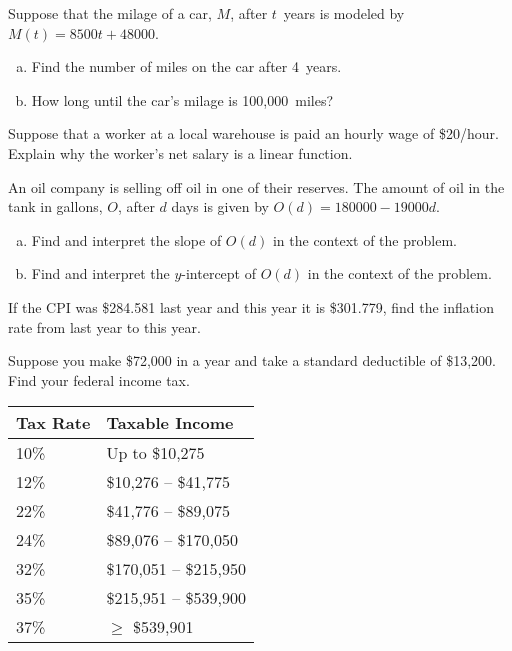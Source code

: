 \documentclass[12pt,letterpaper]{exam}
\begin{document}
\examtitle
{} 
\scores
\newpage

\begin{questions}

\newpage
\question[10] Suppose that the milage of a car, $M$, after $t$~years is modeled by $M(t)= 8500t + 48000$. 
	\begin{enumerate}[(a)]
	\item Find the number of miles on the car after 4~years.
	\item How long until the car's milage is 100,000~miles?
	\end{enumerate}



\newpage
\question[10] Suppose that a worker at a local warehouse is paid an hourly wage of \$20/hour. Explain why the worker's net salary is a linear function. 



\newpage
\question[10] An oil company is selling off oil in one of their reserves. The amount of oil in the tank in gallons, $O$, after $d$ days is given by $O(d)= 180000 - 19000d$.
	\begin{enumerate}[(a)]
	\item Find and interpret the slope of $O(d)$ in the context of the problem. 
	\item Find and interpret the $y$-intercept of $O(d)$ in the context of the problem. 
	\end{enumerate}



\newpage
\question[10] If the CPI was \$284.581 last year and this year it is \$301.779, find the inflation rate from last year to this year. 



\newpage
\question[10] Suppose you make \$72,000 in a year and take a standard deductible of \$13,200. Find your federal income tax. 
	\begin{table}[!ht]
	\centering
	\begin{tabular}{|l|l|} \hline
	Tax Rate & Taxable Income \\ \hline \hline
	10\% & Up to \$10,275 \\ \hline
	12\% & \$10,276 -- \$41,775 \\ \hline
	22\% & \$41,776 -- \$89,075 \\ \hline
	24\% & \$89,076 -- \$170,050 \\ \hline
	32\% & \$170,051 -- \$215,950 \\ \hline
	35\% & \$215,951 -- \$539,900 \\ \hline
	37\% & $\geq$ \$539,901 \\ \hline
	\end{tabular}
	\end{table}




\end{questions}
\end{document}
